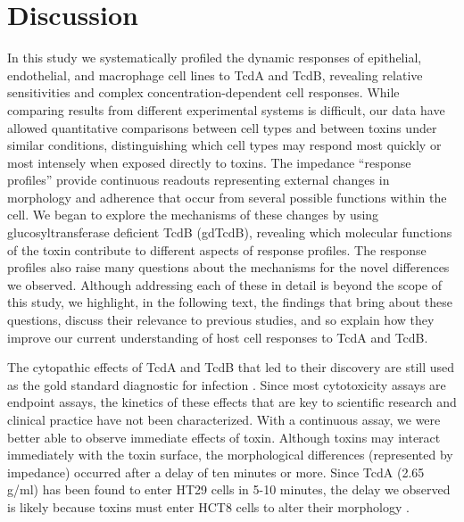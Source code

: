 \section{Discussion}
In this study we systematically profiled the dynamic 
responses of epithelial, endothelial, and macrophage 
cell lines to TcdA and TcdB, revealing relative 
sensitivities and complex concentration-dependent 
cell responses. While comparing results from different 
experimental systems is difficult, our data have allowed 
quantitative comparisons between cell types and between 
toxins under similar conditions, distinguishing which cell 
types may respond most quickly or most intensely when 
exposed directly to toxins. The impedance ``response profiles'' 
provide continuous readouts representing external changes 
in morphology and adherence that occur from several 
possible functions within the cell. We began to explore 
the mechanisms of these changes by using glucosyltransferase 
deficient TcdB (gdTcdB), revealing which molecular 
functions of the toxin contribute to different aspects 
of response profiles. The response profiles also raise 
many questions about the mechanisms for the novel differences 
we observed. Although addressing each of these in detail 
is beyond the scope of this study, we highlight, in the 
following text, the findings that bring about these questions, 
discuss their relevance to previous studies, and so explain 
how they improve our current understanding of host cell 
responses to TcdA and TcdB.

The cytopathic effects of TcdA and TcdB that led to their 
discovery are still used as the gold standard diagnostic 
for infection \cite{Larson:1977th,Planche:2011fm}. Since most cytotoxicity assays 
are endpoint assays, the kinetics of these effects that 
are key to scientific research and clinical practice have 
not been characterized. With a continuous assay, we 
were better able to observe immediate effects of toxin. 
Although toxins may interact immediately with the toxin 
surface, the morphological differences (represented by 
impedance) occurred after a delay of ten minutes or more. 
Since TcdA (2.65 \textmugreek{}g/ml) has been found to enter 
HT29 cells in 5-10 minutes, the delay we observed is likely 
because toxins must enter HCT8 cells to alter their morphology \cite{Olling:2011es}.

